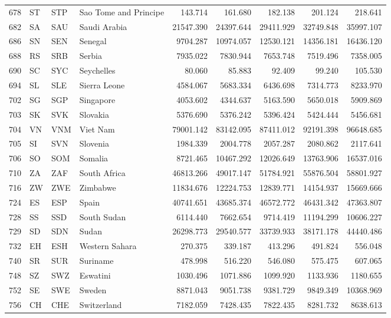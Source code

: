{\begin{longtable}{rlllrrrrr}
 678 & ST & STP & Sao Tome and Principe & 143.714 & 161.680 & 182.138 & 201.124 & 218.641 \\
 682 & SA & SAU & Saudi Arabia & 21547.390 & 24397.644 & 29411.929 & 32749.848 & 35997.107 \\
 686 & SN & SEN & Senegal & 9704.287 & 10974.057 & 12530.121 & 14356.181 & 16436.120 \\
 688 & RS & SRB & Serbia & 7935.022 & 7830.944 & 7653.748 & 7519.496 & 7358.005 \\
 690 & SC & SYC & Seychelles & 80.060 & 85.883 & 92.409 & 99.240 & 105.530 \\
 694 & SL & SLE & Sierra Leone & 4584.067 & 5683.334 & 6436.698 & 7314.773 & 8233.970 \\
 702 & SG & SGP & Singapore & 4053.602 & 4344.637 & 5163.590 & 5650.018 & 5909.869 \\
 703 & SK & SVK & Slovakia & 5376.690 & 5376.242 & 5396.424 & 5424.444 & 5456.681 \\
 704 & VN & VNM & Viet Nam & 79001.142 & 83142.095 & 87411.012 & 92191.398 & 96648.685 \\
 705 & SI & SVN & Slovenia & 1984.339 & 2004.778 & 2057.287 & 2080.862 & 2117.641 \\
 706 & SO & SOM & Somalia & 8721.465 & 10467.292 & 12026.649 & 13763.906 & 16537.016 \\
 710 & ZA & ZAF & South Africa & 46813.266 & 49017.147 & 51784.921 & 55876.504 & 58801.927 \\
 716 & ZW & ZWE & Zimbabwe & 11834.676 & 12224.753 & 12839.771 & 14154.937 & 15669.666 \\
 724 & ES & ESP & Spain & 40741.651 & 43685.374 & 46572.772 & 46431.342 & 47363.807 \\
 728 & SS & SSD & South Sudan & 6114.440 & 7662.654 & 9714.419 & 11194.299 & 10606.227 \\
 729 & SD & SDN & Sudan & 26298.773 & 29540.577 & 33739.933 & 38171.178 & 44440.486 \\
 732 & EH & ESH & Western Sahara & 270.375 & 339.187 & 413.296 & 491.824 & 556.048 \\
 740 & SR & SUR & Suriname & 478.998 & 516.220 & 546.080 & 575.475 & 607.065 \\
 748 & SZ & SWZ & Eswatini & 1030.496 & 1071.886 & 1099.920 & 1133.936 & 1180.655 \\
 752 & SE & SWE & Sweden & 8871.043 & 9051.738 & 9381.729 & 9849.349 & 10368.969 \\
 756 & CH & CHE & Switzerland & 7182.059 & 7428.435 & 7822.435 & 8281.732 & 8638.613 \\

\end{longtable}}
